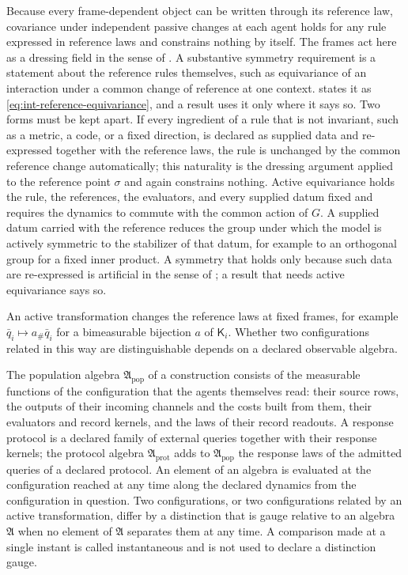Because every frame-dependent object can be written through its reference law, covariance under independent passive changes at each agent holds for any rule expressed in reference laws and constrains nothing by itself. The frames act here as a dressing field in the sense of \citet{FournelEtAl2014}. A substantive symmetry requirement is a statement about the reference rules themselves, such as equivariance of an interaction under a common change of reference at one context.  states it as \cref{eq:int-reference-equivariance}, and a result uses it only where it says so. Two forms must be kept apart. If every ingredient of a rule that is not invariant, such as a metric, a code, or a fixed direction, is declared as supplied data and re-expressed together with the reference laws, the rule is unchanged by the common reference change automatically; this naturality is the dressing argument applied to the reference point $\sigma$ and again constrains nothing. Active equivariance holds the rule, the references, the evaluators, and every supplied datum fixed and requires the dynamics to commute with the common action of $G$. A supplied datum carried with the reference reduces the group under which the model is actively symmetric to the stabilizer of that datum, for example to an orthogonal group for a fixed inner product. A symmetry that holds only because such data are re-expressed is artificial in the sense of \citet{Francois2019}; a result that needs active equivariance says so.

An active transformation changes the reference laws at fixed frames, for example $\bar q_i\mapsto a_\#\bar q_i$ for a bimeasurable bijection $a$ of $\mathsf K_i$. Whether two configurations related in this way are distinguishable depends on a declared observable algebra.

The population algebra $\mathfrak A_{\mathrm{pop}}$ of a construction consists of the measurable functions of the configuration that the agents themselves read: their source rows, the outputs of their incoming channels and the costs built from them, their evaluators and record kernels, and the laws of their record readouts. A response protocol is a declared family of external queries together with their response kernels; the protocol algebra $\mathfrak A_{\mathrm{prot}}$ adds to $\mathfrak A_{\mathrm{pop}}$ the response laws of the admitted queries of a declared protocol. An element of an algebra is evaluated at the configuration reached at any time along the declared dynamics from the configuration in question. Two configurations, or two configurations related by an active transformation, differ by a distinction that is gauge relative to an algebra $\mathfrak A$ when no element of $\mathfrak A$ separates them at any time. A comparison made at a single instant is called instantaneous and is not used to declare a distinction gauge.


